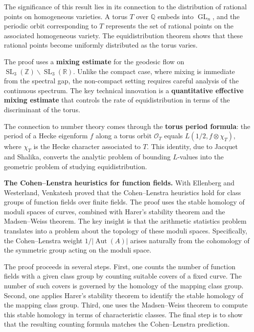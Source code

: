 The significance of this result lies in its connection to the distribution of rational points on homogeneous varieties. A torus $T$ over $\mathbb{Q}$ embeds into $\operatorname{GL}_n$, and the periodic orbit corresponding to $T$ represents the set of rational points on the associated homogeneous variety. The equidistribution theorem shows that these rational points become uniformly distributed as the torus varies.

The proof uses a \textbf{mixing estimate} for the geodesic flow on $\operatorname{SL}_3(\mathbb{Z}) \backslash \operatorname{SL}_3(\mathbb{R})$. Unlike the compact case, where mixing is immediate from the spectral gap, the non-compact setting requires careful analysis of the continuous spectrum. The key technical innovation is a \textbf{quantitative effective mixing estimate} that controls the rate of equidistribution in terms of the discriminant of the torus.

The connection to number theory comes through the \textbf{torus period formula}: the period of a Hecke eigenform $f$ along a torus orbit $\mathcal{O}_T$ equals $L(1/2, f \otimes \chi_T)$, where $\chi_T$ is the Hecke character associated to $T$. This identity, due to Jacquet and Shalika, converts the analytic problem of bounding $L$-values into the geometric problem of studying equidistribution.

\textbf{The Cohen--Lenstra heuristics for function fields.} With Ellenberg and Westerland, Venkatesh proved that the Cohen--Lenstra heuristics hold for class groups of function fields over finite fields. The proof uses the stable homology of moduli spaces of curves, combined with Harer's stability theorem and the Madsen--Weiss theorem. The key insight is that the arithmetic statistics problem translates into a problem about the topology of these moduli spaces. Specifically, the Cohen--Lenstra weight $1/|\operatorname{Aut}(A)|$ arises naturally from the cohomology of the symmetric group acting on the moduli space.

The proof proceeds in several steps. First, one counts the number of function fields with a given class group by counting suitable covers of a fixed curve. The number of such covers is governed by the homology of the mapping class group. Second, one applies Harer's stability theorem to identify the stable homology of the mapping class group. Third, one uses the Madsen--Weiss theorem to compute this stable homology in terms of characteristic classes. The final step is to show that the resulting counting formula matches the Cohen--Lenstra prediction.

